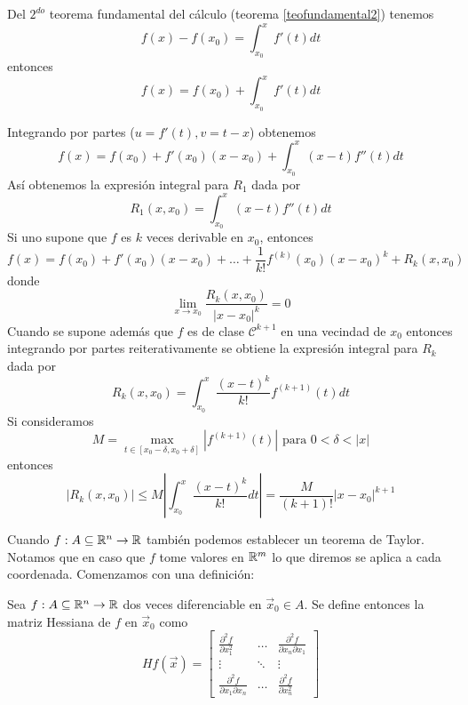 \begin{demostracion}
Del $2^{do}$ teorema fundamental del c\'alculo (teorema \ref{teofundamental2}) tenemos
$$f(x)-f(x_0)=\int_{x_0}^x f'(t)dt$$
entonces
$$f(x)=f(x_0)+\int_{x_0}^x f'(t)dt$$

Integrando por partes ($u=f'(t), v=t-x$) obtenemos
$$f(x)=f(x_0)+f'(x_0)(x-x_0)+\int_{x_0}^x(x-t)f''(t)dt$$
As\'i obtenemos la expresi\'on integral para $R_1$ dada por
$$R_1(x,x_0)=\int_{x_0}^x(x-t)f''(t)dt$$
Si uno supone que $f$ es $k$ veces derivable en $x_0$, entonces
$$f(x)=f(x_0)+f'(x_0)(x-x_0)+\ldots+\frac{1}{k!}f^{(k)}(x_0)(x-x_0)^k+R_k(x,x_0)$$
donde 
$$\lim_{x\to x_0}\frac{R_k(x,x_0)}{|x-x_0|^k}=  0$$
Cuando se supone adem\'as que $f$ es de clase $\mathcal{C}^{k+1}$ en una vecindad de $x_0$  
entonces integrando por partes reiterativamente se obtiene la expresi\'on integral
para $R_k$ dada por
$$R_k(x,x_0)=\int_{x_0}^x\frac{(x-t)^k}{k!}f^{(k+1)}(t)dt$$
Si consideramos
 $$M=\max_{t\in [x_0-\delta,x_0+\delta]}|f^{(k+1)}(t)| \text{ para } 0<\delta<|x|$$
entonces
$$
|R_k(x,x_0)|\leq M\left|\int_{x_0}^x\frac{(x-t)^k}{k!}dt\right|=
\frac{M}{(k+1)!}|x-x_0|^{k+1}$$
\end{demostracion}


Cuando $f:A\subseteq\mathbb{R}^n\to\mathbb{R}$ tambi\'en podemos establecer un
teorema de Taylor. Notamos que en caso que $f$ tome valores en $\mathbb{R}^m$ lo que diremos
se aplica a cada coordenada. Comenzamos con una definici\'on:
\begin{definicion} Sea $\f1$ dos veces diferenciable en
$\vec{x}_0\in A$. Se define entonces la matriz Hessiana de $f$ en $\vec{x}_0$ como
\[ Hf(\vec{x})=
\left[
\begin{array}{ccc}
\frac{\partial^2 f}{\partial x_1^2} & \ldots & \frac{\partial^2
f}{\partial x_n \partial x_1} \\
\vdots & \ddots & \vdots \\
\frac{\partial^2 f}{\partial x_1 \partial x_n} & \ldots &
\frac{\partial^2 f}{\partial x_n^2}
\end{array}
\right] \]
\end{definicion}

